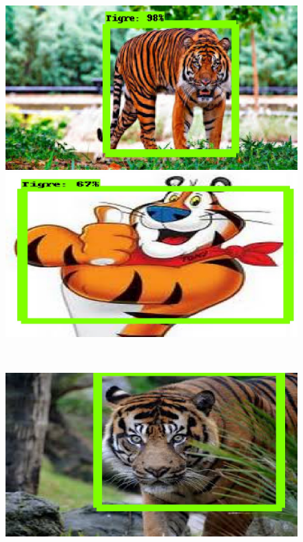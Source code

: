   \begin{figure}[H]
  \centering
  \begin{minipage}{0.46\textwidth}
    \centering
    \includegraphics[width=\linewidth]{figs/tigre_1_v2.jpeg}
  \end{minipage}
  \hspace{2mm}
  \begin{minipage}{0.46\textwidth}
    \centering
    \includegraphics[width=\linewidth]{figs/tigre_2_v2.jpeg}
  \end{minipage}
  \\[4mm] %
  \begin{minipage}{0.46\textwidth}
    \centering
    \includegraphics[width=\linewidth]{figs/tigre_4_v2.jpeg}

\end{minipage}
\end{figure}

